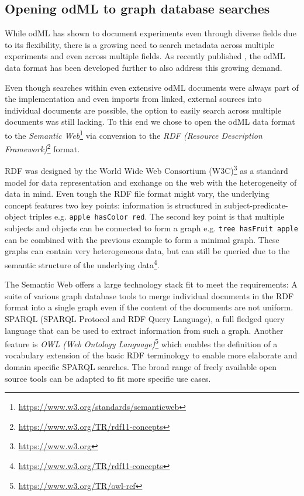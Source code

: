 \documentclass{article}
\begin{document}
\subsection{Opening odML to graph database searches} \label{sec::why_rdf}

While odML has shown to document experiments even through diverse fields due to its flexibility, there is a growing need to search metadata across multiple experiments and even across multiple fields. As recently published \cite{Sprenger_2019}, the odML data format has been developed further to also address this growing demand.

Even though searches within even extensive odML documents were always part of the implementation and even imports from linked, external sources into individual documents are possible, the option to easily search across multiple documents was still lacking. To this end we chose to open the odML data format to the \textit{Semantic Web}\footnote{\url{https://www.w3.org/standards/semanticweb}} via conversion to the \textit{RDF (Resource Description Framework)}\footnote{\url{https://www.w3.org/TR/rdf11-concepts}} format.

RDF was designed by the World Wide Web Consortium (W3C)\footnote{\url{https://www.w3.org}} as a standard model for data representation and exchange on the web with the heterogeneity of data in mind. Even tough the RDF file format might vary, the underlying concept features two key points: information is structured in subject-predicate-object triples e.g. \texttt{apple hasColor red}. The second key point is that multiple subjects and objects can be connected to form a graph e.g. \texttt{tree hasFruit apple} can be combined with the previous example to form a minimal graph. These graphs can contain very heterogeneous data, but can still be queried due to the semantic structure of the underlying data\footnote{\url{https://www.w3.org/TR/rdf11-concepts}}.

The Semantic Web offers a large technology stack fit to meet the requirements: A suite of various graph database tools to merge individual documents in the RDF format into a single graph even if the content of the documents are not uniform. SPARQL (SPARQL Protocol and RDF Query Language), a full fledged query language that can be used to extract information from such a graph. Another feature is \textit{OWL (Web Ontology Language)}\footnote{\url{https://www.w3.org/TR/owl-ref}} which enables the definition of a vocabulary extension of the basic RDF terminology to enable more elaborate and domain specific SPARQL searches. The broad range of freely available open source tools can be adapted to fit more specific use cases.
\end{document}
